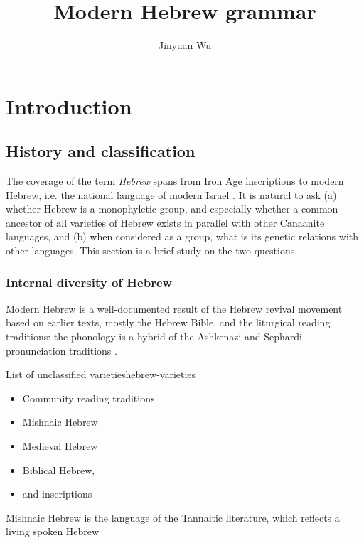 \documentclass[a4paper, oneside, 12pt]{report}
\title{Modern Hebrew grammar}
\author{Jinyuan Wu}
\newcommand*{\citepage}[1]{p.~{#1}}
\newcommand*{\term}[1]{\emph{#1}}
\begin{document}
\maketitle

\automath

\chapter{Introduction}

\section{History and classification}

The coverage of the term \term{Hebrew} spans from Iron Age inscriptions to modern Hebrew, i.e. the national language of modern Israel \citep[\citepage{533}]{pat2019semitic}.
It is natural to ask 
(a) whether Hebrew is a monophyletic group,
and especially whether a common ancestor of all varieties of Hebrew exists
in parallel with other Canaanite languages, and 
(b) when considered as a group, what is its genetic relations with other languages.
This section is a brief study on the two questions. 

\subsection{Internal diversity of Hebrew}

Modern Hebrew is a well-documented result of the Hebrew revival movement based on earlier texts, mostly the Hebrew Bible, and the liturgical reading traditions:
the phonology is a hybrid of the Ashkenazi and Sephardi pronunciation traditions \citep[\citepage{574}]{pat2019semitic}.

\begin{todobox}{List of unclassified varieties}{hebrew-varieties}
    \begin{itemize}
        \item Community reading traditions
        \item Mishnaic Hebrew 
        \item Medieval Hebrew 
        \item Biblical Hebrew, 
        \item and inscriptions
    \end{itemize}
\end{todobox}

Mishnaic Hebrew is the language of the Tannaitic literature,
which reflects a living spoken Hebrew 
\end{document}
